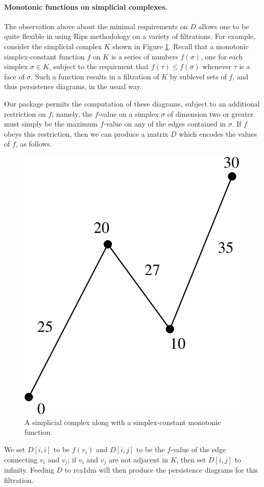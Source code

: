 \documentclass[a4paper,10pt]{article}
\begin{document}
\paragraph{Monotonic functions on simplicial complexes.}

The observation above about the minimal requirements on $D$ allows one to be quite flexible in using Rips methodology on a variety of filtrations.
For example, consider the simplicial complex $K$ shown in Figure \ref{fig:c}.
Recall that a monotonic simplex-constant function $f$ on $K$ is a series
of numbers $f(\sigma)$, one for each simplex $\sigma \in K$, subject to the requirment
that $f(\tau) \leq f(\sigma)$ whenever $\tau$ is a face of $\sigma$.
Such a function results in a filtration of $K$ by sublevel sets of $f$, and thus persistence diagrams, in the usual way.

Our package permits the computation of these diagrams, subject to an additional restriction on $f$; namely,
the $f$-value on a simplex $\sigma$ of dimension two or greater must simply be the maximum $f$-value on any of the edges contained in
$\sigma$.
If $f$ obeys this restriction, then we can produce a matrix $D$ which encodes the values of $f$, as follows.
\begin{figure}
 \includegraphics[scale=0.2]{complex}
\caption{A simplicial complex along with a simplex-constant monotonic function.}
\label{fig:c}
\end{figure}
We set $D[i,i]$ to be $f(v_i)$ and $D[i,j]$ to be the $f$-value of the edge connecting $v_i$ and $v_j$; if
$v_i$ and $v_j$ are not adjacent in $K$, then set $D[i,j]$ to infinity.
Feeding $D$ to rca1dm will then produce the persistence diagrams for this filtration.
\end{document}
